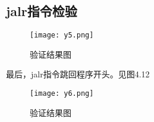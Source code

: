 \subsection{jalr指令检验}
\begin{figure}
	\centering %
	\texttt{[image: y5.png]} %
	\caption{验证结果图} %
	\label{Fig.11} %
\end{figure}
最后，jalr指令跳回程序开头。见图4.12
\begin{figure}
	\centering %
	\texttt{[image: y6.png]} %
	\caption{验证结果图} %
	\label{Fig.12} %
\end{figure}